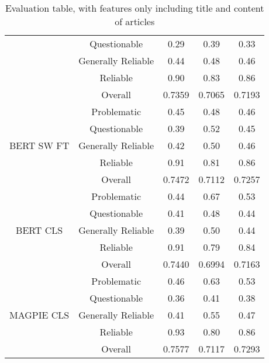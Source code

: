 \begin{table}[htbp]
\begin{tabular}{| c | c | c | c | c |}
                                                 & Questionable       & 0.29      & 0.39   & 0.33   \\
                                                 & Generally Reliable & 0.44      & 0.48   & 0.46   \\
                                                 & Reliable           & 0.90      & 0.83   & 0.86   \\
                                                 & Overall            & 0.7359    & 0.7065 & 0.7193 \\
        \hline
        \multirow{5}{*}{BERT SW FT}              & Problematic        & 0.45      & 0.48   & 0.46   \\
                                                 & Questionable       & 0.39      & 0.52   & 0.45   \\
                                                 & Generally Reliable & 0.42      & 0.50   & 0.46   \\
                                                 & Reliable           & 0.91      & 0.81   & 0.86   \\
                                                 & Overall            & 0.7472    & 0.7112 & 0.7257 \\
        \hline
        \multirow{5}{*}{BERT CLS}                & Problematic        & 0.44      & 0.67   & 0.53   \\
                                                 & Questionable       & 0.41      & 0.48   & 0.44   \\
                                                 & Generally Reliable & 0.39      & 0.50   & 0.44   \\
                                                 & Reliable           & 0.91      & 0.79   & 0.84   \\
                                                 & Overall            & 0.7440    & 0.6994 & 0.7163 \\
        \hline
        \multirow{5}{*}{MAGPIE CLS}              & Problematic        & 0.46      & 0.63   & 0.53   \\
                                                 & Questionable       & 0.36      & 0.41   & 0.38   \\
                                                 & Generally Reliable & 0.41      & 0.55   & 0.47   \\
                                                 & Reliable           & 0.93      & 0.80   & 0.86   \\
                                                 & Overall            & 0.7577    & 0.7117 & 0.7293 \\
        \hline
    \end{tabular}
    \caption{Evaluation table, with features only including title and content of articles}
    \label{table:eval}
\end{table}

